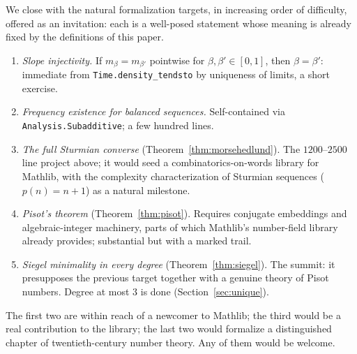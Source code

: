 \documentclass[11pt]{amsart}
\theoremstyle{plain}
\theoremstyle{definition}
\theoremstyle{remark}
\begin{document}
We close with the natural formalization targets, in increasing order of difficulty, offered as an invitation: each is a well-posed statement whose meaning is already fixed by the definitions of this paper.
\begin{enumerate}
\item \emph{Slope injectivity.} If $m_{\beta} = m_{\beta'}$ pointwise for $\beta, \beta' \in [0,1]$, then $\beta = \beta'$: immediate from \texttt{Time.density\_tendsto} by uniqueness of limits, a short exercise.
\item \emph{Frequency existence for balanced sequences.} Self-contained via \texttt{Analysis.Subadditive}; a few hundred lines.
\item \emph{The full Sturmian converse} (Theorem~\ref{thm:morsehedlund}). The $1200$--$2500$ line project above; it would seed a combinatorics-on-words library for Mathlib, with the complexity characterization of Sturmian sequences ($p(n) = n+1$) as a natural milestone.
\item \emph{Pisot's theorem} (Theorem~\ref{thm:pisot}). Requires conjugate embeddings and algebraic-integer machinery, parts of which Mathlib's number-field library already provides; substantial but with a marked trail.
\item \emph{Siegel minimality in every degree} (Theorem~\ref{thm:siegel}). The summit: it presupposes the previous target together with a genuine theory of Pisot numbers. Degree at most $3$ is done (Section~\ref{sec:unique}).
\end{enumerate}
The first two are within reach of a newcomer to Mathlib; the third would be a real contribution to the library; the last two would formalize a distinguished chapter of twentieth-century number theory. Any of them would be welcome.
\end{document}
